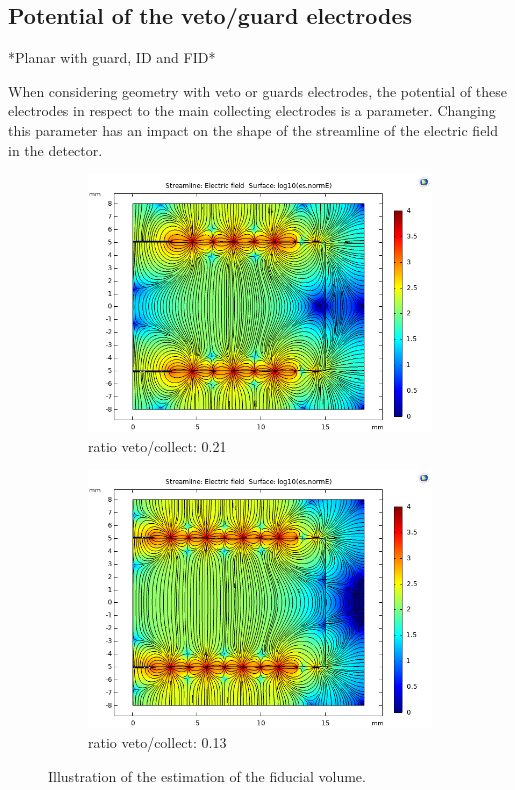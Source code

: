 \subsection{Potential of the veto/guard electrodes}

*Planar with guard, ID and FID*

When considering geometry with veto or guards electrodes, the potential of these electrodes in respect to the main collecting electrodes is a parameter.
Changing this parameter has an impact on the shape of the streamline of the electric field in the detector.

\begin{figure}
\centering
\begin{subfigure}{.5\textwidth}
  \centering
  \includegraphics[width=\linewidth]{Figures/Electrodes/potential_veto_0.png}
  \caption{ratio veto/collect: 0.21}
  \label{fig:ratio-veto-0}
\end{subfigure}%
\begin{subfigure}{0.5\textwidth}
  \centering
  \includegraphics[width=\linewidth]{Figures/Electrodes/potential_veto_1.png}
  \caption{ratio veto/collect: 0.13}
  \label{fig:veto-ratio-1}
\end{subfigure}
\caption{Illustration of the estimation of the fiducial volume.}
\label{fig:veto-ratio}
\end{figure}

